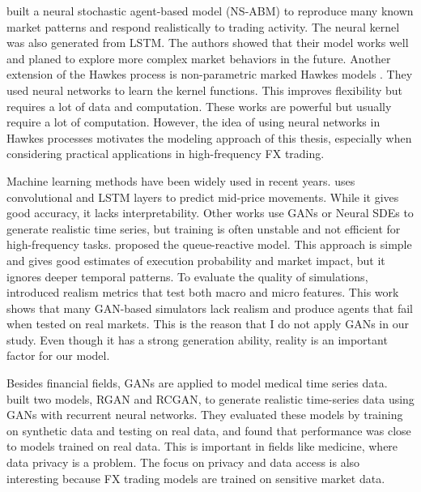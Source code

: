\cite{shi_neural_2023} built a neural stochastic agent-based model (NS-ABM) to reproduce many known market patterns and respond realistically to trading activity. The neural kernel was also generated from LSTM. The authors showed that their model works well and planed to explore more complex market behaviors in the future. Another extension of the Hawkes process is non-parametric marked Hawkes models \citep{joseph_non-parametric_2024}. They used neural networks to learn the kernel functions. This improves flexibility but requires a lot of data and computation. These works are powerful but usually require a lot of computation. However, the idea of using neural networks in Hawkes processes motivates the modeling approach of this thesis, especially when considering practical applications in high-frequency FX trading.

Machine learning methods have been widely used in recent years. \cite{briola_deep_2024} uses convolutional and LSTM layers to predict mid-price movements. While it gives good accuracy, it lacks interpretability. Other works use GANs \citep{brophy_quick_2019} or Neural SDEs \citep{issa_non-adversarial_2023} to generate realistic time series, but training is often unstable and not efficient for high-frequency tasks. \cite{huang_simulating_2014} proposed the queue-reactive model. This approach is simple and gives good estimates of execution probability and market impact, but it ignores deeper temporal patterns. To evaluate the quality of simulations, \cite{vyetrenko_get_2019} introduced realism metrics that test both macro and micro features. This work shows that many GAN-based simulators lack realism and produce agents that fail when tested on real markets. This is the reason that I do not apply GANs in our study. Even though it has a strong generation ability, reality is an important factor for our model.

Besides financial fields, GANs are applied to model medical time series data. \cite{esteban_real-valued_2017} built two models, RGAN and RCGAN, to generate realistic time-series data using GANs with recurrent neural networks. They evaluated these models by training on synthetic data and testing on real data, and found that performance was close to models trained on real data. This is important in fields like medicine, where data privacy is a problem. The focus on privacy and data access is also interesting because FX trading models are trained on sensitive market data.

